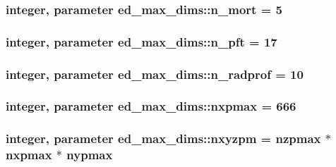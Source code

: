 \subsubsection[{\texorpdfstring{n\+\_\+mort}{n_mort}}]{\setlength{\rightskip}{0pt plus 5cm}integer, parameter ed\+\_\+max\+\_\+dims\+::n\+\_\+mort = 5}\hypertarget{namespaceed__max__dims_a8e6b880e0c740346e2450c60e80b8a09}{}\label{namespaceed__max__dims_a8e6b880e0c740346e2450c60e80b8a09}
\subsubsection[{\texorpdfstring{n\+\_\+pft}{n_pft}}]{\setlength{\rightskip}{0pt plus 5cm}integer, parameter ed\+\_\+max\+\_\+dims\+::n\+\_\+pft = 17}\hypertarget{namespaceed__max__dims_ade9d322dcecc058458fce6b2093d5890}{}\label{namespaceed__max__dims_ade9d322dcecc058458fce6b2093d5890}
\subsubsection[{\texorpdfstring{n\+\_\+radprof}{n_radprof}}]{\setlength{\rightskip}{0pt plus 5cm}integer, parameter ed\+\_\+max\+\_\+dims\+::n\+\_\+radprof = 10}\hypertarget{namespaceed__max__dims_a33cf3454a80e938f8951d733d40b53d7}{}\label{namespaceed__max__dims_a33cf3454a80e938f8951d733d40b53d7}
\subsubsection[{\texorpdfstring{nxpmax}{nxpmax}}]{\setlength{\rightskip}{0pt plus 5cm}integer, parameter ed\+\_\+max\+\_\+dims\+::nxpmax = 666}\hypertarget{namespaceed__max__dims_a916d08772a2cdff90b033432f7c043dd}{}\label{namespaceed__max__dims_a916d08772a2cdff90b033432f7c043dd}
\subsubsection[{\texorpdfstring{nxyzpm}{nxyzpm}}]{\setlength{\rightskip}{0pt plus 5cm}integer, parameter ed\+\_\+max\+\_\+dims\+::nxyzpm = {\bf nzpmax} $\ast$ {\bf nxpmax} $\ast$ {\bf nypmax}}\hypertarget{namespaceed__max__dims_a1a2dbf06e020c31e81f4f1b3537e7111}{}\label{namespaceed__max__dims_a1a2dbf06e020c31e81f4f1b3537e7111}
